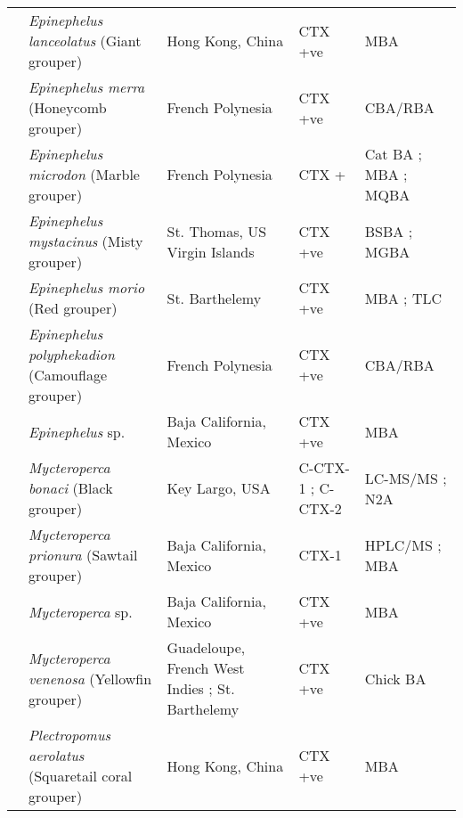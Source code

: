 \documentclass[12pt]{article}
\begin{document}
\begin{longtable}{  | p{2cm} | p{3cm} | p{4.5cm}  | p{2cm} | p{3cm}  | }
  & \emph{Epinephelus lanceolatus} (Giant grouper) & Hong Kong, China \cite{wong2009solid} & CTX +ve \cite{wong2009solid} & MBA \cite{wong2009solid}  \\
    & \emph{Epinephelus merra} (Honeycomb grouper) & French Polynesia \cite{chinain2014mail} & CTX +ve \cite{chinain2014mail} & CBA/RBA \cite{chinain2014mail} \\
  &  \emph{Epinephelus microdon} (Marble grouper) & French Polynesia \cite{bagnis1987use} & CTX +\cite{bagnis1987use} & Cat BA \cite{bagnis1987use}; MBA \cite{bagnis1987use}; MQBA \cite{bagnis1987use} \\
  & \emph{Epinephelus mystacinus} (Misty grouper)  & St. Thomas, US Virgin Islands \cite{granade1976ciguatera} & CTX +ve \cite{granade1976ciguatera} & BSBA \cite{granade1976ciguatera}; MGBA \cite{granade1976ciguatera} \\
  & \emph{Epinephelus morio} (Red grouper) & St. Barthelemy \cite{vernoux1986heterogeneity} & CTX +ve\cite{vernoux1986heterogeneity} & MBA \cite{vernoux1986heterogeneity}; TLC \cite{vernoux1986heterogeneity} \\
    & \emph{Epinephelus polyphekadion} (Camouflage grouper) & French Polynesia \cite{chinain2014mail} & CTX +ve \cite{chinain2014mail} & CBA/RBA \cite{chinain2014mail} \\
  &  \emph{Epinephelus} sp. & Baja California, Mexico \cite{lechuga1995documented} & CTX +ve \cite{lechuga1995documented} & MBA \cite{lechuga1995documented} \\
  & \emph{Mycteroperca bonaci}  (Black grouper) & Key Largo, USA  \cite{dickey2008ciguatera} & C-CTX-1 \cite{dickey2008ciguatera}; C-CTX-2 \cite{dickey2008ciguatera} & LC-MS/MS \cite{dickey2008ciguatera}; N2A \cite{dickey2008ciguatera} \\
  & \emph{Mycteroperca prionura} (Sawtail grouper) & Baja California, Mexico \cite{sierra1998overview} & CTX-1 \cite{sierra1998overview} & HPLC/MS \cite{sierra1998overview}; MBA \cite{sierra1998overview} \\
  &  \emph{Mycteroperca} sp. & Baja California, Mexico \cite{lechuga1995documented} & CTX +ve \cite{lechuga1995documented} & MBA \cite{lechuga1995documented} \\
  & \emph{Mycteroperca venenosa}  (Yellowfin grouper) & Guadeloupe, French West Indies \cite{}; St. Barthelemy \cite{} & CTX +ve \cite{} & Chick BA \cite{}\\
  & \emph{Plectropomus aerolatus} (Squaretail coral grouper) & Hong Kong, China \cite{wong2005study} & CTX +ve \cite{wong2005study} & MBA \cite{wong2005study} \\

\end{longtable}
\end{document}
